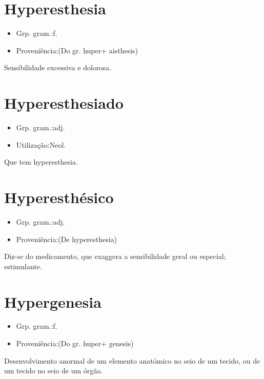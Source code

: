 \documentclass{article}
\begin{document}
\section{Hyperesthesia}
\begin{itemize}
\item {Grp. gram.:f.}
\end{itemize}
\begin{itemize}
\item {Proveniência:(Do gr. \textunderscore huper\textunderscore  + \textunderscore aisthesis\textunderscore )}
\end{itemize}
Sensibilidade excessiva e dolorosa.
\section{Hyperesthesiado}
\begin{itemize}
\item {Grp. gram.:adj.}
\end{itemize}
\begin{itemize}
\item {Utilização:Neol.}
\end{itemize}
Que tem hyperesthesia.
\section{Hyperesthésico}
\begin{itemize}
\item {Grp. gram.:adj.}
\end{itemize}
\begin{itemize}
\item {Proveniência:(De \textunderscore hyperesthesia\textunderscore )}
\end{itemize}
Diz-se do medicamento, que exaggera a sensibilidade geral ou especial; estimulante.
\section{Hypergenesia}
\begin{itemize}
\item {Grp. gram.:f.}
\end{itemize}
\begin{itemize}
\item {Proveniência:(Do gr. \textunderscore huper\textunderscore  + \textunderscore genesis\textunderscore )}
\end{itemize}
Desenvolvimento anormal de um elemento anatómico no seio de um tecido, ou de um tecido no seio de um órgão.
\end{document}
